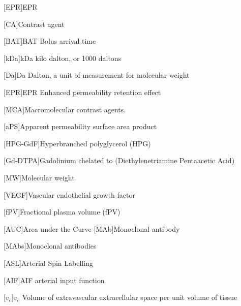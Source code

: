 \begin{acronym}
[EPR]{EPR}%

[CA]{Contrast agent}

[BAT]{BAT Bolus arrival time}

[kDa]{kDa kilo dalton, or 1000 daltons}

[Da]{Da Dalton, a unit of measurement for molecular weight}

[EPR]{EPR Enhanced permeability retention effect}

[MCA]{Macromolecular contrast agents.}

[aPS]{Apparent permeability surface area product}%

[HPG-GdF]{Hyperbranched polyglycerol (HPG)}%

[Gd-DTPA]{Gadolinium chelated to (Diethylenetriamine Pentaacetic Acid)}%

[MW]{Molecular weight}

[VEGF]{Vascular endothelial growth factor}

[fPV]{Fractional plasma volume (fPV)}

[AUC]{Area under the Curve}%
[MAb]{Monoclonal antibody}

[MAbs]{Monoclonal antibodies}

[ASL]{Arterial Spin Labelling}

[AIF]{AIF arterial input function}

[$v_e$]{$v_e$ Volume of extravascular extracellular space per unit volume of tissue}


\end{acronym}
